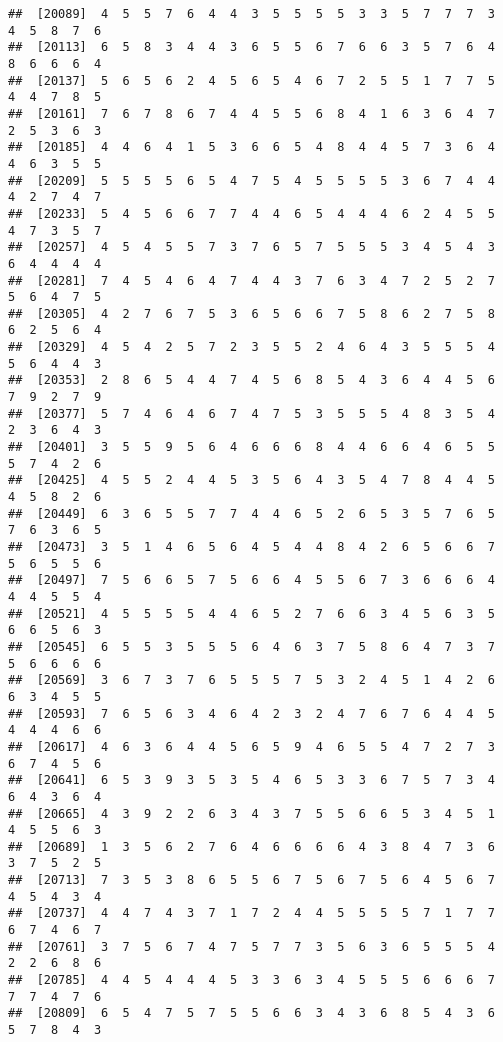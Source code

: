 \documentclass[
]{book}
\begin{document}
\begin{verbatim}
##  [20089]  4  5  5  7  6  4  4  3  5  5  5  5  3  3  5  7  7  7  3  4  5  8  7  6
##  [20113]  6  5  8  3  4  4  3  6  5  5  6  7  6  6  3  5  7  6  4  8  6  6  6  4
##  [20137]  5  6  5  6  2  4  5  6  5  4  6  7  2  5  5  1  7  7  5  4  4  7  8  5
##  [20161]  7  6  7  8  6  7  4  4  5  5  6  8  4  1  6  3  6  4  7  2  5  3  6  3
##  [20185]  4  4  6  4  1  5  3  6  6  5  4  8  4  4  5  7  3  6  4  4  6  3  5  5
##  [20209]  5  5  5  5  6  5  4  7  5  4  5  5  5  5  3  6  7  4  4  4  2  7  4  7
##  [20233]  5  4  5  6  6  7  7  4  4  6  5  4  4  4  6  2  4  5  5  4  7  3  5  7
##  [20257]  4  5  4  5  5  7  3  7  6  5  7  5  5  5  3  4  5  4  3  6  4  4  4  4
##  [20281]  7  4  5  4  6  4  7  4  4  3  7  6  3  4  7  2  5  2  7  5  6  4  7  5
##  [20305]  4  2  7  6  7  5  3  6  5  6  6  7  5  8  6  2  7  5  8  6  2  5  6  4
##  [20329]  4  5  4  2  5  7  2  3  5  5  2  4  6  4  3  5  5  5  4  5  6  4  4  3
##  [20353]  2  8  6  5  4  4  7  4  5  6  8  5  4  3  6  4  4  5  6  7  9  2  7  9
##  [20377]  5  7  4  6  4  6  7  4  7  5  3  5  5  5  4  8  3  5  4  2  3  6  4  3
##  [20401]  3  5  5  9  5  6  4  6  6  6  8  4  4  6  6  4  6  5  5  5  7  4  2  6
##  [20425]  4  5  5  2  4  4  5  3  5  6  4  3  5  4  7  8  4  4  5  4  5  8  2  6
##  [20449]  6  3  6  5  5  7  7  4  4  6  5  2  6  5  3  5  7  6  5  7  6  3  6  5
##  [20473]  3  5  1  4  6  5  6  4  5  4  4  8  4  2  6  5  6  6  7  5  6  5  5  6
##  [20497]  7  5  6  6  5  7  5  6  6  4  5  5  6  7  3  6  6  6  4  4  4  5  5  4
##  [20521]  4  5  5  5  5  4  4  6  5  2  7  6  6  3  4  5  6  3  5  6  6  5  6  3
##  [20545]  6  5  5  3  5  5  5  6  4  6  3  7  5  8  6  4  7  3  7  5  6  6  6  6
##  [20569]  3  6  7  3  7  6  5  5  5  7  5  3  2  4  5  1  4  2  6  6  3  4  5  5
##  [20593]  7  6  5  6  3  4  6  4  2  3  2  4  7  6  7  6  4  4  5  4  4  4  6  6
##  [20617]  4  6  3  6  4  4  5  6  5  9  4  6  5  5  4  7  2  7  3  6  7  4  5  6
##  [20641]  6  5  3  9  3  5  3  5  4  6  5  3  3  6  7  5  7  3  4  6  4  3  6  4
##  [20665]  4  3  9  2  2  6  3  4  3  7  5  5  6  6  5  3  4  5  1  4  5  5  6  3
##  [20689]  1  3  5  6  2  7  6  4  6  6  6  6  4  3  8  4  7  3  6  3  7  5  2  5
##  [20713]  7  3  5  3  8  6  5  5  6  7  5  6  7  5  6  4  5  6  7  4  5  4  3  4
##  [20737]  4  4  7  4  3  7  1  7  2  4  4  5  5  5  5  7  1  7  7  6  7  4  6  7
##  [20761]  3  7  5  6  7  4  7  5  7  7  3  5  6  3  6  5  5  5  4  2  2  6  8  6
##  [20785]  4  4  5  4  4  4  5  3  3  6  3  4  5  5  5  6  6  6  7  7  7  4  7  6
##  [20809]  6  5  4  7  5  7  5  5  6  6  3  4  3  6  8  5  4  3  6  5  7  8  4  3

\end{verbatim}
\end{document}
